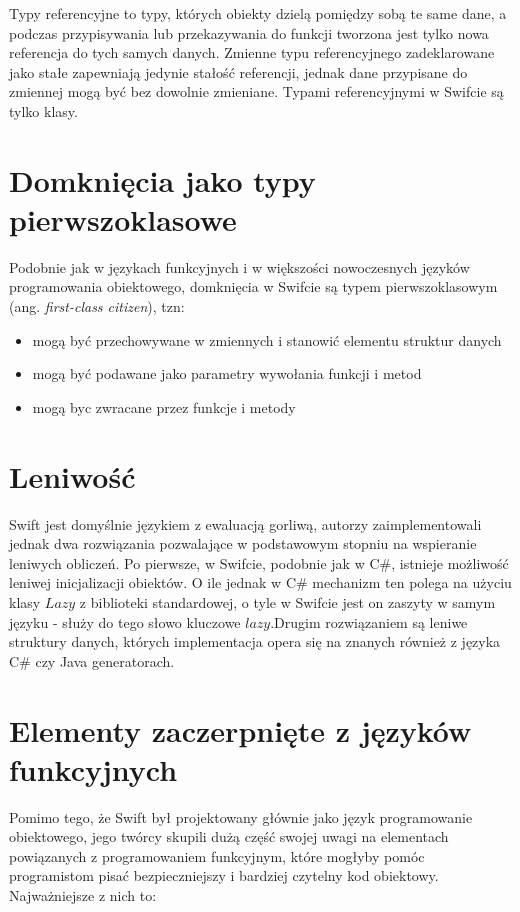 \documentclass[mgr, shortabstract]{iithesis}
\newcommand{\ang}[1]{ang. \textit{#1}}
\begin{document}
Typy referencyjne to typy, których obiekty dzielą pomiędzy sobą te same dane, a podczas przypisywania lub przekazywania do funkcji tworzona jest tylko nowa referencja do tych samych danych. Zmienne typu referencyjnego zadeklarowane jako stałe zapewniają jedynie stałość referencji, jednak dane przypisane do zmiennej mogą być bez dowolnie zmieniane. Typami referencyjnymi w Swifcie są tylko klasy.

\section{Domknięcia jako typy pierwszoklasowe}

Podobnie jak w językach funkcyjnych i w większości nowoczesnych języków programowania obiektowego, domknięcia w Swifcie są typem pierwszoklasowym (\ang{first-class citizen}), tzn:

\begin{itemize}
    \item mogą być przechowywane w zmiennych i stanowić elementu struktur danych
    \item mogą być podawane jako parametry wywołania funkcji i metod
    \item mogą byc zwracane przez funkcje i metody
\end{itemize}

\section{Leniwość}

Swift jest domyślnie językiem z ewaluacją gorliwą, autorzy zaimplementowali jednak dwa rozwiązania pozwalające w podstawowym stopniu na wspieranie leniwych obliczeń. Po pierwsze, w Swifcie, podobnie jak w C\#, istnieje możliwość leniwej inicjalizacji obiektów. O ile jednak w C\# mechanizm ten polega na użyciu klasy $Lazy$ z biblioteki standardowej, o tyle w Swifcie jest on zaszyty w samym języku - służy do tego słowo kluczowe $lazy$.Drugim rozwiązaniem są leniwe struktury danych, których implementacja opera się na znanych również z języka C\# czy Java generatorach.

\section{Elementy zaczerpnięte z języków funkcyjnych}

Pomimo tego, że Swift był projektowany głównie jako język programowanie obiektowego, jego twórcy skupili dużą część swojej uwagi na elementach powiązanych z programowaniem funkcyjnym, które mogłyby pomóc programistom pisać bezpieczniejszy i bardziej czytelny kod obiektowy. Najważniejsze z nich to:
\end{document}
